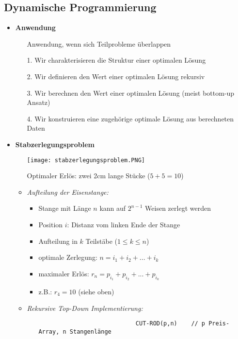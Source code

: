 \subsection{Dynamische Programmierung}
    \begin{itemize}
        \item \textbf{Anwendung}
            \begin{itemize}
                \item[] Anwendung, wenn sich Teilprobleme überlappen
                \item[1.] Wir charakterisieren die Struktur einer optimalen Lösung
                \item[2.] Wir definieren den Wert einer optimalen Lösung rekursiv
                \item[3.] Wir berechnen den Wert einer optimalen Lösung (meist bottom-up Ansatz)
                \item[4.] Wir konstruieren eine zugehörige optimale Lösung aus berechneten Daten   
            \end{itemize}

        \item \textbf{Stabzerlegungsproblem}
            \begin{itemize}
                \item[] \texttt{[image: stabzerlegungsproblem.PNG]}
                \item[] Optimaler Erlös: zwei 2cm lange Stücke ($5+5=10$) 
                \item \textit{Aufteilung der Eisenstange:}
                    \begin{itemize}
                        \item Stange mit Länge $n$ kann auf $2^{n-1}$ Weisen zerlegt werden
                        \item Position $i$: Distanz vom linken Ende der Stange
                        \item Aufteilung in $k$ Teilstäbe ($1 \leq k \leq n$)
                        \item optimale Zerlegung: $n = i_1 + i_2 + ... + i_k$
                        \item maximaler Erlös: $r_n = p_{i_1} + p_{i_2} + ... + p_{i_k}$
                        \item z.B.: $r_4 = 10$ (siehe oben)
                    \end{itemize}
\pagebreak
                \item \textit{Rekursive Top-Down Implementierung:}
                    \begin{itemize}
                        \item[]
                            \begin{verbatim}
                            CUT-ROD(p,n)    // p Preis-Array, n Stangenlänge


\end{verbatim}
\end{itemize}
\end{itemize}
\end{itemize}
